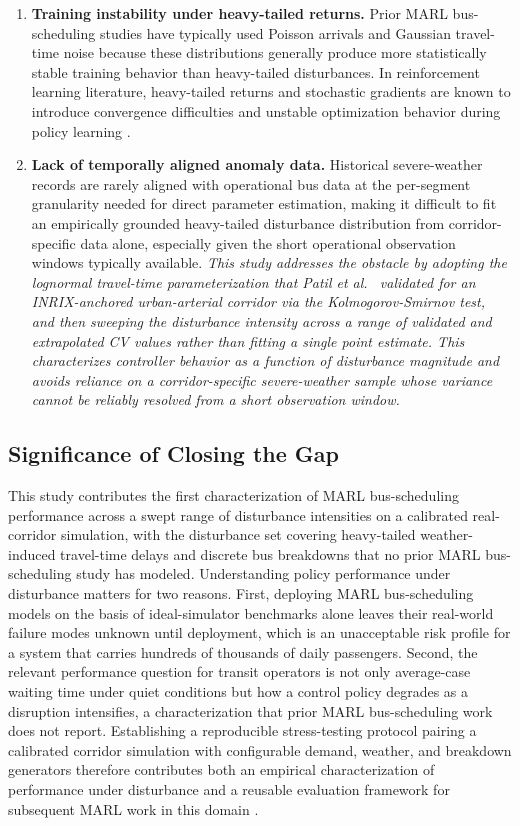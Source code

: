 \begin{enumerate}
\item \textbf{Training instability under heavy-tailed returns.} Prior MARL bus-scheduling studies have typically used Poisson arrivals and Gaussian travel-time noise because these distributions generally produce more statistically stable training behavior than heavy-tailed disturbances. In reinforcement learning literature, heavy-tailed returns and stochastic gradients are known to introduce convergence difficulties and unstable optimization behavior during policy learning \cite{Henderson2018Matters,Agarwal2021Precipice}.
\clearpage
\item \textbf{Lack of temporally aligned anomaly data.} Historical severe-weather records are rarely aligned with operational bus data at the per-segment granularity needed for direct parameter estimation, making it difficult to fit an empirically grounded heavy-tailed disturbance distribution from corridor-specific data alone, especially given the short operational observation windows typically available. \textit{This study addresses the obstacle by adopting the lognormal travel-time parameterization that Patil et al.\ \cite{Patil2025Conformal} validated for an INRIX-anchored urban-arterial corridor via the Kolmogorov-Smirnov test, and then sweeping the disturbance intensity across a range of validated and extrapolated CV values rather than fitting a single point estimate. This characterizes controller behavior as a function of disturbance magnitude and avoids reliance on a corridor-specific severe-weather sample whose variance cannot be reliably resolved from a short observation window.}
\end{enumerate}

\subsection{Significance of Closing the Gap}
This study contributes the first characterization of MARL bus-scheduling performance across a swept range of disturbance intensities on a calibrated real-corridor simulation, with the disturbance set covering heavy-tailed weather-induced travel-time delays and discrete bus breakdowns that no prior MARL bus-scheduling study has modeled. Understanding policy performance under disturbance matters for two reasons. First, deploying MARL bus-scheduling models on the basis of ideal-simulator benchmarks alone leaves their real-world failure modes unknown until deployment, which is an unacceptable risk profile for a system that carries hundreds of thousands of daily passengers. Second, the relevant performance question for transit operators is not only average-case waiting time under quiet conditions but how a control policy degrades as a disruption intensifies, a characterization that prior MARL bus-scheduling work does not report. Establishing a reproducible stress-testing protocol pairing a calibrated corridor simulation with configurable demand, weather, and breakdown generators therefore contributes both an empirical characterization of performance under disturbance and a reusable evaluation framework for subsequent MARL work in this domain \cite{Li2023Departure,Wang2024MultiAGV,Che2024Recharging,Huang2025Joint,Bokade2023MARL}.
